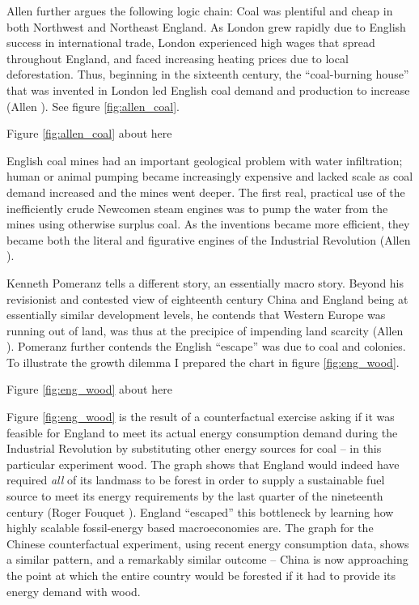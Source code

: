 \documentclass[12pt]{article}
\numberwithin{equation}{section}
\begin{document}
		Allen further argues the following logic chain: Coal was plentiful and cheap in both Northwest and Northeast England. As London grew rapidly due to English success in international trade, London experienced high wages that spread throughout England, and faced increasing heating prices due to local deforestation. Thus, beginning in the sixteenth century, the ``coal-burning house'' that was invented in London led English coal demand and production to increase (Allen \citeyear[p.~82]{allen_british_2009}).  See figure \ref{fig:allen_coal}.
		
\begin{center}
Figure \ref{fig:allen_coal} about here
\end{center}
		


		English coal mines had an important geological problem with water infiltration; human or animal pumping became increasingly expensive and lacked scale as coal demand increased and the mines went deeper. The first real, practical use of the inefficiently crude Newcomen steam engines was to pump the water from the mines using otherwise surplus coal. As the inventions became more efficient, they became both the literal and figurative engines of the Industrial Revolution (Allen \citeyear[pp.~86 -- 93]{allen_british_2009}).
		
		Kenneth Pomeranz tells a different story, an essentially macro story. Beyond his revisionist and contested view of eighteenth century China and England being at essentially similar development levels, he contends that Western Europe was running out of land, was thus at the precipice of impending land scarcity (Allen \citeyear[p.~264]{allen_british_2009}). Pomeranz further contends the English ``escape'' was due to coal and colonies. To illustrate the growth dilemma I prepared the chart in figure  \ref{fig:eng_wood}. 
		
\begin{center}
Figure \ref{fig:eng_wood} about here
\end{center}
			

	
		Figure \ref{fig:eng_wood} is the result of a counterfactual exercise asking if it was feasible for England to meet its actual energy consumption demand during the Industrial Revolution by substituting other energy sources for coal -- in this particular experiment wood.  The graph shows that England would indeed have required \textit{all} of its landmass to be forest in order to supply a sustainable fuel source to meet its energy requirements by the last quarter of the nineteenth century (Roger Fouquet \citeyear{fouquet_heat_2008}). England ``escaped'' this bottleneck by learning how highly scalable fossil-energy based macroeconomies are. The graph for the Chinese counterfactual experiment, using recent energy consumption data, shows a similar pattern, and a remarkably similar outcome -- China is now approaching the point at which the entire country would be forested if it had to provide its energy demand with wood.
		
\end{document}
